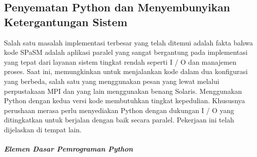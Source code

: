 \documentclass[12pt,a4paper]{article}
\begin{document}
\subsection{Penyematan Python dan Menyembunyikan Ketergantungan Sistem}
Salah satu masalah implementasi terbesar yang telah ditemui adalah fakta bahwa kode SPaSM adalah aplikasi paralel yang sangat bergantung pada implementasi yang tepat dari layanan sistem tingkat rendah seperti I / O dan manajemen proses. Saat ini, memungkinkan untuk menjalankan kode dalam dua konfigurasi yang berbeda, salah satu yang menggunakan pesan yang lewat melalui perpustakaan MPI dan yang lain menggunakan benang Solaris. Menggunakan Python dengan kedua versi kode membutuhkan tingkat kepedulian. Khususnya perushaan merasa perlu menyediakan Python dengan dukungan I / O yang ditingkatkan untuk berjalan dengan baik secara paralel. Pekerjaan ini telah dijelaskan di tempat lain.

\subparagraph{Elemen Dasar Pemrograman Python}
\end{document}
